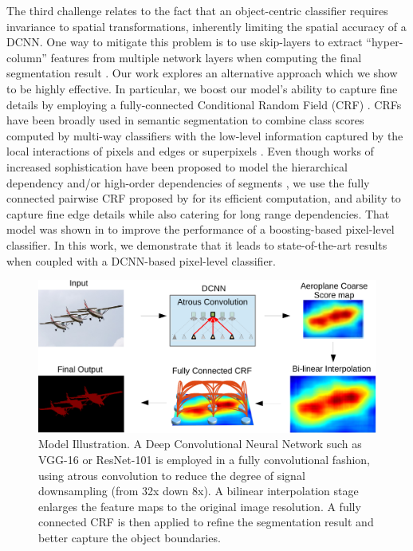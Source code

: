 The third challenge relates to the fact that an object-centric classifier 
requires invariance to spatial transformations, inherently
limiting the spatial accuracy of a DCNN. One way to mitigate this
problem is to use skip-layers to extract ``hyper-column'' features from multiple network layers when
computing the final segmentation result
\cite{hariharan2014hypercolumns, long2014fully}. Our work explores an
alternative approach which we show to be highly effective. In particular, we
boost our model's ability to capture fine details by employing a fully-connected
Conditional Random Field (CRF) \cite{krahenbuhl2011efficient}. CRFs have been
broadly used in semantic segmentation to combine class scores computed by
multi-way classifiers with the low-level information captured by the local
interactions of pixels and edges
\cite{rother2004grabcut, shotton2009textonboost} or superpixels
\cite{lucchi2011spatial}. Even though works of increased sophistication have
been proposed to model the hierarchical dependency \cite{he2004multiscale,
  ladicky2009associative, lempitsky2011pylon} and/or high-order dependencies
of segments \cite{delong2012fast, gonfaus2010harmony, kohli2009robust, CPY13, Wang15}, we
use the fully connected pairwise CRF proposed by
\cite{krahenbuhl2011efficient} for its efficient computation, and ability to
capture fine edge details while also catering for long range dependencies. That
model was shown in \cite{krahenbuhl2011efficient} to improve the performance of
a boosting-based pixel-level classifier. In this work, we demonstrate that it
leads to state-of-the-art results when coupled with a DCNN-based pixel-level
classifier.

\begin{figure}[!th]
  \centering
  \includegraphics[width=0.7\linewidth]{fig/model_illustration4.pdf}
  \caption{Model Illustration. A Deep Convolutional Neural Network such as
  VGG-16 or ResNet-101 is employed in a fully convolutional fashion, using
  atrous convolution to reduce the degree of signal downsampling (from 32x
  down 8x). A bilinear interpolation stage enlarges the feature maps to the
  original image resolution. A fully connected CRF is then applied to refine
  the segmentation result and better capture the object boundaries.}
  \label{fig:ModelIllustration}
\end{figure}

